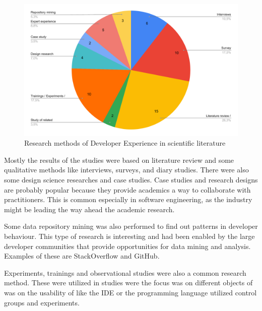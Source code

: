 \documentclass[english, 12pt, a4paper, sci, utf8, a-1b, online]{aaltothesis}
\newcounter{subsubsubsection}[subsubsection]
\begin{document}
\begin{figure}[ht]
  \captionsetup{width=0.6\textwidth}
  \caption{Research methods of Developer Experience in scientific literature}
  \begin{center}
    \includegraphics[width=\textwidth]{research-methods-scientific.pdf}
  \end{center}
\end{figure}

Mostly the results of the studies were based on literature review and some qualitative methods like interviews, surveys, and diary studies. There were also some design science researches and case studies. Case studies and research designs are probably popular because they provide academics a way to collaborate with practitioners. This is common especially in software engineering, as the industry might be leading the way ahead the academic research.

Some data repository mining was also performed to find out patterns in developer behaviour. This type of research is interesting and had been enabled by the large developer communities that provide opportunities for data mining and analysis. Examples of these are StackOverflow and GitHub.

Experiments, trainings and observational studies were also a common research method. These were utilized in studies were the focus was on different objects of  was on the usability of  like the IDE or the programming language utilized control groups and experiments.

\end{document}
